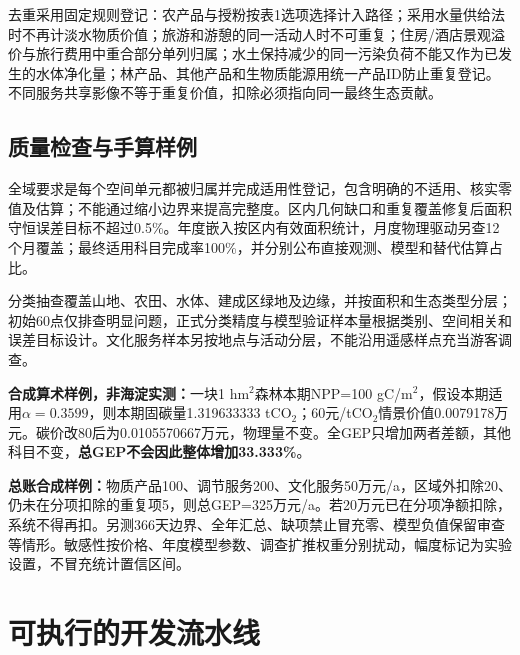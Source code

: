\documentclass[12pt,a4paper,fontset=fandol]{ctexart}
\begin{document}
去重采用固定规则登记：农产品与授粉按表1选项选择计入路径；采用水量供给法时不再计淡水物质价值；旅游和游憩的同一活动人时不可重复；住房/酒店景观溢价与旅行费用中重合部分单列归属；水土保持减少的同一污染负荷不能又作为已发生的水体净化量；林产品、其他产品和生物质能源用统一产品ID防止重复登记。不同服务共享影像不等于重复价值，扣除必须指向同一最终生态贡献。


\subsection{质量检查与手算样例}
全域要求是每个空间单元都被归属并完成适用性登记，包含明确的不适用、核实零值及估算；不能通过缩小边界来提高完整度。区内几何缺口和重复覆盖修复后面积守恒误差目标不超过0.5\%。年度嵌入按区内有效面积统计，月度物理驱动另查12个月覆盖；最终适用科目完成率100\%，并分别公布直接观测、模型和替代估算占比。

分类抽查覆盖山地、农田、水体、建成区绿地及边缘，并按面积和生态类型分层；初始60点仅排查明显问题，正式分类精度与模型验证样本量根据类别、空间相关和误差目标设计。文化服务样本另按地点与活动分层，不能沿用遥感样点充当游客调查。

\textbf{合成算术样例，非海淀实测：}一块1 hm$^2$森林本期NPP=100 gC/m$^2$，假设本期适用$\alpha=0.3599$，则本期固碳量1.319633333 tCO$_2$；60元/tCO$_2$情景价值0.0079178万元。碳价改80后为0.0105570667万元，物理量不变。全GEP只增加两者差额，其他科目不变，\textbf{总GEP不会因此整体增加33.333\%}。

\textbf{总账合成样例：}物质产品100、调节服务200、文化服务50万元/a，区域外扣除20、仍未在分项扣除的重复项5，则总GEP=325万元/a。若20万元已在分项净额扣除，系统不得再扣。另测366天边界、全年汇总、缺项禁止冒充零、模型负值保留审查等情形。敏感性按价格、年度模型参数、调查扩推权重分别扰动，幅度标记为实验设置，不冒充统计置信区间。


\section{可执行的开发流水线}
\end{document}
